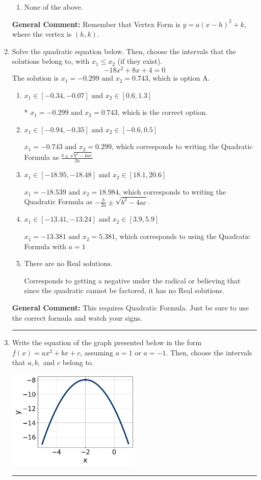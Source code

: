 \documentclass{extbook}[14pt]
\newcommand{\litem}[1]{\item #1

\rule{\textwidth}{0.4pt}}
\begin{document}
\begin{enumerate}
{\begin{enumerate}[label=\Alph*.]
\begin{multicols}{2}
\end{multicols}\item None of the above.\end{enumerate}
\textbf{General Comment:} Remember that Vertex Form is $y = a(x-h)^2+k$, where the vertex is $(h, k)$.
}
\litem{
Solve the quadratic equation below. Then, choose the intervals that the solutions belong to, with $x_1 \leq x_2$ (if they exist).
\[ -18x^{2} +8 x + 4 = 0 \]The solution is \( x_1 = -0.299 \text{ and } x_2 = 0.743 \), which is option A.\begin{enumerate}[label=\Alph*.]
\item \( x_1 \in [-0.34, -0.07] \text{ and } x_2 \in [0.6, 1.3] \)

* $x_1 = -0.299 \text{ and } x_2 = 0.743$, which is the correct option.
\item \( x_1 \in [-0.94, -0.35] \text{ and } x_2 \in [-0.6, 0.5] \)

 $x_1 = -0.743 \text{ and } x_2 = 0.299$, which corresponds to writing the Quadratic Formula as $\frac{b \pm \sqrt{b^2 - 4ac}}{2a}$
\item \( x_1 \in [-18.95, -18.48] \text{ and } x_2 \in [18.1, 20.6] \)

 $x_1 = -18.539 \text{ and } x_2 = 18.984$, which corresponds to writing the Quadratic Formula as $-\frac{b}{2a} \pm \sqrt{b^2 - 4ac}$.
\item \( x_1 \in [-13.41, -13.24] \text{ and } x_2 \in [3.9, 5.9] \)

 $x_1 = -13.381 \text{ and } x_2 = 5.381$, which corresponds to using the Quadratic Formula with $a=1$
\item \( \text{There are no Real solutions.} \)

Corresponds to getting a negative under the radical or believing that since the quadratic cannot be factored, it has no Real solutions.
\end{enumerate}

\textbf{General Comment:} This requires Quadratic Formula. Just be sure to use the correct formula and watch your signs.
}
\litem{
Write the equation of the graph presented below in the form $f(x)=ax^2+bx+c$, assuming  $a=1$ or $a=-1$. Then, choose the intervals that $a, b,$ and $c$ belong to.

\begin{center}
    \includegraphics[width=0.5\textwidth]{../Figures/quadraticGraphToEquationB.png}
\end{center}


}
\end{enumerate}
\end{document}
